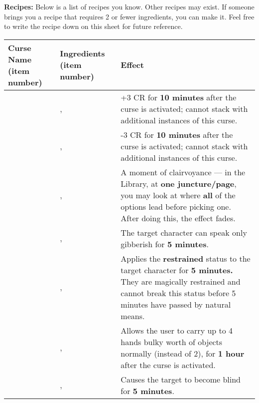 \documentclass[green]{GL2020}
\begin{document}
\textbf{Recipes:}
Below is a list of recipes you know. Other recipes may exist. If someone brings you a recipe that requires 2 or fewer ingredients, you can make it. Feel free to write the recipe down on this sheet for future reference.

\begin{tabularx}{\textwidth}{| >{\centering\arraybackslash} m{4cm} | >{\centering\arraybackslash} m{4cm} | X |}
\hline
	\textbf{Curse Name (item number)} & \textbf{Ingredients (item number)}  & \textbf{Effect} \\
\hline
\hline
	\iCourage{}	&	\iMoonflower{}, \iLimestone{}   & +3 CR  for \textbf{10 minutes} after the curse is activated; cannot stack with additional instances of this curse.	\\
\hline
	\iWeakness{}	& \iNightshade{}, \iBlackCrocus{}   &	-3 CR  for \textbf{10 minutes} after the curse is activated; cannot stack with additional instances of this curse. \\
\hline	
	\iInsight{}	& \iMorningGlory{}, \iEagleFeather{}	& A moment of clairvoyance — in the Library, at \textbf{one juncture/page}, you may look at where \textbf{all} of the options lead before picking one. After doing this, the effect fades. \\
\hline	
	\iBabble{}	& \iClay{}, \iSpiderWeb{}	&	The target character can speak only gibberish for \textbf{5 minutes}. \\
\hline	
	\iRestraint{}	& \iSpiderWeb{}, \iLily{}	&	Applies the \textbf{restrained} status to the target character for \textbf{5 minutes.} They are magically restrained and cannot break this status before 5 minutes have passed by natural means.\\
\hline	
	\iStrength{}	&	\iFlameOrchid{}, \iObsidian{} &	Allows the user to carry up to 4 hands bulky worth of objects normally (instead of 2), for \textbf{1 hour} after the curse is activated. \\
\hline	
	\iBlindness{}	&	\iMorningGlory{}, \iClay{} & Causes the target to become blind for \textbf{5 minutes}.\\
\hline	

\end{tabularx}
\end{document}
